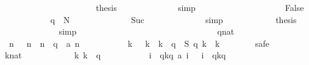\begin{isabellebody}
\ \ \ \ \ \ \ \ \ \ \isamarkupfalse%
\isanewline
\ \ \ \ \ \ \ \ \ \ \isamarkupfalse%
\ {\isacharquery}thesis\isanewline
\ \ \ \ \ \ \ \ \ \ \ \ \isamarkupfalse%
\ simp\isanewline
\ \ \ \ \ \ \ \ \isamarkupfalse%
\isanewline
\ \ \ \ \ \ \ \ \ \ \isamarkupfalse%
\ False\isanewline
\ \ \ \ \ \ \ \ \ \ \isamarkupfalse%
\ {\isachardoublequoteopen}q\ {\isacharequal}\ N{\isacharplus}{}{\isachardoublequoteclose}\isanewline
\ \ \ \ \ \ \ \ \ \ \ \ \isamarkupfalse%
\ Suc{\isacharparenleft}{}{\isacharparenright}\isanewline
\ \ \ \ \ \ \ \ \ \ \ \ \isamarkupfalse%
\ simp\isanewline
\ \ \ \ \ \ \ \ \ \ \isamarkupfalse%
\ {\isacharquery}thesis\isanewline
\ \ \ \ \ \ \ \ \ \ \ \ \isamarkupfalse%
\ simp\isanewline
\ \ \ \ \ \ \ \ \isamarkupfalse%
\isanewline
\ \ \ \ \ \ \isamarkupfalse%
\isanewline
\ \ \ \ \isamarkupfalse%
\isanewline
\isanewline
\ \ \ \ \isacommand{{\isacharbraceleft}}\isamarkupfalse%
\isanewline
\ \ \ \ \ \ \isamarkupfalse%
\ q{\isacharcolon}{\isacharcolon}nat\isanewline
\ \ \ \ \ \ \isamarkupfalse%
\ {\isachardoublequoteopen}{\isasymforall}\ n{\isachardot}\ {}\ {\isasymle}\ n\ {\isasymand}\ n\ {\isacharless}\ q\ {\isasymlongrightarrow}\ a\ n\ {\isacharequal}\ {}{\isachardoublequoteclose}\isanewline
\isanewline
\ \ \ \ \ \ \isamarkupfalse%
\ {\isachardoublequoteopen}{\isasymforall}\ k{\isachardot}\ {}\ {\isasymle}\ k\ {\isasymand}\ k\ {\isacharless}\ q\ {\isasymlongrightarrow}\ {\isacharquery}S\ q\ k\ {\isacharequal}\ k{\isachardoublequoteclose}\isanewline
\ \ \ \ \ \ \isamarkupfalse%
\ safe\isanewline
\ \ \ \ \ \ \ \ \isamarkupfalse%
\ k{\isacharcolon}{\isacharcolon}nat\isanewline
\ \ \ \ \ \ \ \ \isamarkupfalse%
\ {\isachardoublequoteopen}{}\ {\isasymle}\ k{\isachardoublequoteclose}\ {\isachardoublequoteopen}k\ {\isacharless}\ q{\isachardoublequoteclose}\isanewline
\ \ \ \ \ \ \ \ \isamarkupfalse%
\ {\isachardoublequoteopen}{\isacharparenleft}{\isasymSum}\ i\ {\isasymleftarrow}\ {\isacharbrackleft}q{\isacharminus}k{\isachardot}{\isachardot}{\isacharless}q{\isacharbrackright}{\isachardot}\ a\ i{\isacharparenright}\ {\isacharequal}\ {\isacharparenleft}{\isasymSum}\ i\ {\isasymleftarrow}\ {\isacharbrackleft}q{\isacharminus}k{\isachardot}{\isachardot}{\isacharless}q{\isacharbrackright}{\isachardot}\ {}{\isacharparenright}{\isachardoublequoteclose}\isanewline

\end{isabellebody}
